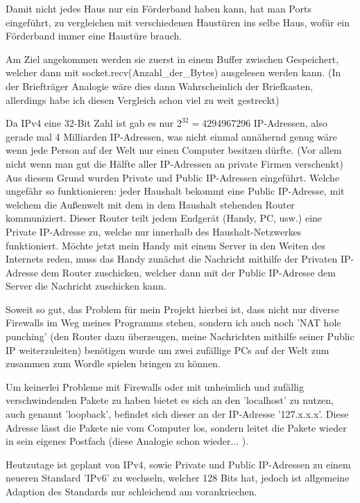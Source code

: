 \documentclass[a4paper]{article}
\begin{document}
                Damit nicht jedes Haus nur ein Förderband haben kann, hat man Ports eingeführt, zu vergleichen mit verschiedenen Haustüren ins selbe Haus, wofür ein Förderband immer eine Haustüre brauch.
                
                Am Ziel angekommen werden sie zuerst in einem Buffer zwischen Gespeichert, 
                welcher dann mit socket.recv(Anzahl\_der\_Bytes) ausgelesen werden kann. (In der Briefträger Analogie wäre dies dann Wahrscheinlich der Briefkasten, allerdings habe ich diesen Vergleich schon viel zu weit gestreckt)
                
                Da IPv4 eine 32-Bit Zahl ist gab es nur $2^{32} = 4294967296$ IP-Adressen, also gerade mal 4 Milliarden IP-Adressen, was nicht einmal annähernd genug wäre wenn jede Person auf der Welt nur einen Computer besitzen dürfte. (Vor allem nicht wenn man gut die Hälfte aller IP-Adressen an private Firmen verschenkt) Aus diesem Grund wurden Private und Public IP-Adressen eingeführt. Welche ungefähr so funktionieren: jeder Haushalt bekommt eine Public IP-Adresse, mit welchem die Außenwelt mit dem in dem Haushalt stehenden Router kommuniziert. Dieser Router teilt jedem Endgerät (Handy, PC, usw.) eine Private IP-Adresse zu, welche nur innerhalb des Haushalt-Netzwerkes funktioniert. Möchte jetzt mein Handy mit einem Server in den Weiten des Internets reden, muss das Handy zunächst die Nachricht mithilfe der Privaten IP-Adresse dem Router zuschicken, welcher dann mit der Public IP-Adresse dem Server die Nachricht zuschicken kann.
                
                Soweit so gut, das Problem für mein Projekt hierbei ist, dass nicht nur diverse Firewalls im Weg meines Programms stehen, sondern ich auch noch 'NAT hole punching' (den Router dazu überzeugen, meine Nachrichten mithilfe seiner Public IP weiterzuleiten) benötigen wurde um zwei zufällige PCs auf der Welt zum zusammen zum Wordle spielen bringen zu können.
                
                Um keinerlei Probleme mit Firewalls oder mit unheimlich und zufällig verschwindenden Pakete zu haben bietet es sich an den 'localhost' zu nutzen, auch genannt 'loopback', befindet sich dieser an der IP-Adresse '127.x.x.x'. Diese Adresse lässt die Pakete nie vom Computer los, sondern leitet die Pakete wieder in sein eigenes Postfach (diese Analogie schon wieder... ).
                
                Heutzutage ist geplant von IPv4, sowie Private und Public IP-Adressen zu einem neueren Standard 'IPv6' zu wechseln, welcher 128 Bits hat, jedoch ist allgemeine Adaption des Standards nur schleichend am vorankriechen.
                
\end{document}
